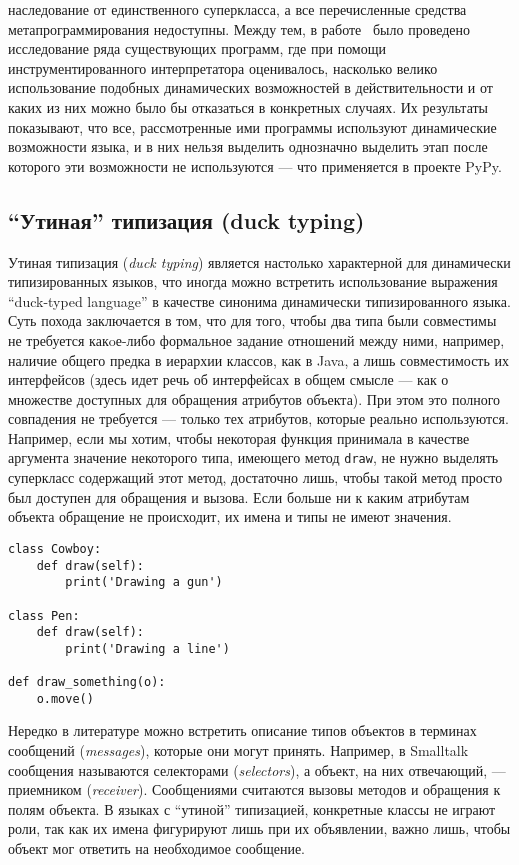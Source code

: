 \begin{itemize}
{      наследование от единственного суперкласса, а все перечисленные средства
      метапрограммирования недоступны.  Между тем, в работе~\cite{Holkner2009} было проведено
      исследование ряда существующих программ, где при помощи инструментированного
      интерпретатора оценивалось, насколько велико использование подобных
      динамических возможностей в действительности и от каких из них можно было бы
      отказаться в конкретных случаях. Их результаты показывают, что все,
      рассмотренные ими программы используют динамические возможности языка, и в них
      нельзя выделить однозначно выделить этап после которого эти возможности не
      используются --- что применяется в проекте PyPy.
    }
\end{itemize}

\subsection{``Утиная'' типизация (duck typing)}

Утиная типизация (\emph{duck typing}) является настолько характерной для динамически
типизированных языков, что иногда можно встретить использование
выражения ``duck-typed language'' в качестве синонима динамически типизированного
языка. Суть похода заключается в том, что для того, чтобы два типа были
совместимы не требуется какoе-либо формальное задание отношений между ними,
например, наличие общего предка в иерархии классов, как в Java, а лишь совместимость их
интерфейсов (здесь идет речь об интерфейсах в общем смысле --- как о множестве
доступных для обращения атрибутов объекта). При этом это полного совпадения не
требуется --- только тех атрибутов, которые реально используются. 
Например, если мы хотим, чтобы некоторая функция принимала в
качестве аргумента значение некоторого типа, имеющего метод \texttt{draw}, не нужно
выделять суперкласс содержащий этот метод, достаточно лишь, чтобы такой метод
просто был доступен для обращения и вызова. Если больше ни к каким атрибутам
объекта обращение не происходит, их имена и типы не имеют значения.

\pagebreak
\begin{lstlisting}
class Cowboy:
    def draw(self):
        print('Drawing a gun')

class Pen:
    def draw(self):
        print('Drawing a line')

def draw_something(o):
    o.move()
\end{lstlisting}

Нередко в литературе можно встретить описание типов объектов в терминах
сообщений (\emph{messages}), которые они могут принять. Например, в Smalltalk
сообщения называются селекторами (\emph{selectors}), а объект, на них отвечающий, ---
приемником (\emph{receiver}). Сообщениями считаются вызовы методов и обращения к полям
объекта. В языках с ``утиной'' типизацией, конкретные классы не играют роли, так
как их имена фигурируют лишь при их объявлении, важно лишь, чтобы объект мог
ответить на необходимое сообщение.  

